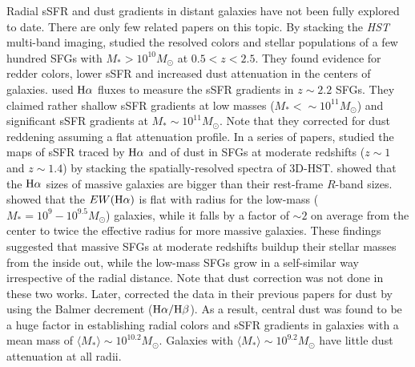 \documentclass[twocolumn]{aastex61}
\begin{document}
Radial sSFR and dust gradients in distant galaxies 
have not been fully explored to date. There are only few related papers on this topic. 
%
By stacking the {\it HST} multi-band imaging, 
\citet[][]{Wuyts12} studied the resolved colors and stellar populations
of a few hundred SFGs with $M_{\ast} > 10^{10}M_{\odot}$ at $0.5<z<2.5$. 
They found evidence for redder colors, lower sSFR and increased dust attenuation in the centers of galaxies. 
%
\citet[][]{Tacchella15} used $\rm H{\alpha}$ fluxes to measure 
the sSFR gradients in $z\sim2.2$ SFGs. 
They claimed rather shallow sSFR gradients at low masses ($M_{\ast} < \sim 10^{11}M_{\odot}$) 
and significant sSFR gradients at $M_{\ast} \sim 10^{11}M_{\odot}$. 
Note that they corrected for dust reddening assuming a flat attenuation profile. 
In a series of papers, \citet{Nelson12,Nelson16b,Nelson16a} studied the maps of sSFR traced by $\rm H{\alpha}$ 
and of dust in SFGs at moderate redshifts ($z\sim1$ and $z\sim1.4$) 
by stacking the spatially-resolved spectra of 3D-HST.
%
\citet[][]{Nelson12} showed that the $\rm H{\alpha}$ sizes of massive galaxies
are bigger than their rest-frame $R$-band sizes. 
\citet[][]{Nelson16b} showed that the $EW({\rm H{\alpha}})$ is flat with radius for
the low-mass ($M_{\ast} = 10^{9}-10^{9.5}M_{\odot}$) galaxies, 
while it falls by a factor 
of $\sim2$ on average from the center to twice the effective radius for more massive galaxies.
These findings suggested that massive SFGs at moderate redshifts buildup 
their stellar masses from the inside out,
while the low-mass SFGs grow in a self-similar way irrespective of the radial distance.
Note that dust correction was not done in these two works. 
%
Later, \citet[][]{Nelson16a} corrected the data in their previous papers for dust by 
using the Balmer decrement ($\rm H{\alpha}/H{\beta}$). 
As a result, central dust was found to be a huge factor in establishing radial colors and sSFR 
gradients in galaxies with a mean mass of $\langle M_{\ast} \rangle \sim 10^{10.2}M_{\odot}$. Galaxies 
with $\langle M_{\ast} \rangle \sim 10^{9.2}M_{\odot}$ have little dust attenuation at all radii. 
\end{document}

